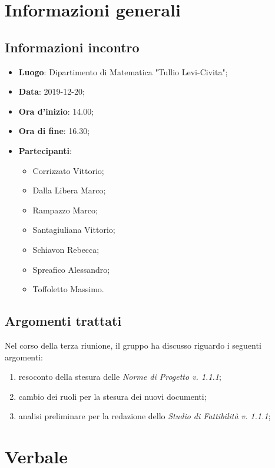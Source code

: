 \section{Informazioni generali}
    \subsection{Informazioni incontro}
        \begin{itemize}
            \item \textbf{Luogo}: Dipartimento di Matematica "Tullio Levi-Civita";
            \item \textbf{Data}: 2019-12-20;
            \item \textbf{Ora d'inizio}: 14.00;
            \item \textbf{Ora di fine}: 16.30;
            \item \textbf{Partecipanti}: \begin{itemize}
                \item Corrizzato Vittorio;
                \item Dalla Libera Marco;
                \item Rampazzo Marco;
                \item Santagiuliana Vittorio;
                \item Schiavon Rebecca;
                \item Spreafico Alessandro;
                \item Toffoletto Massimo.
            \end{itemize}
        \end{itemize}
    \subsection{Argomenti trattati}
        Nel corso della terza riunione, il gruppo ha discusso riguardo i seguenti argomenti:
        \begin{enumerate}
            \item resoconto della stesura delle \textit{Norme di Progetto v. 1.1.1};
            \item cambio dei ruoli per la stesura dei nuovi documenti;
            \item analisi preliminare per la redazione dello \textit{Studio di Fattibilità v. 1.1.1};
        \end{enumerate}
\section{Verbale}
